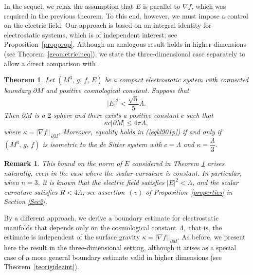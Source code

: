 \documentclass{amsart}
\newtheorem{theoremletter}{Theorem}
\newtheorem{remark}{Remark}
\numberwithin{equation}{section}
\begin{document}
In the sequel, we relax the assumption that 
\( E \) is parallel to \( \nabla f \), which was required in the previous theorem. To this end, however, we must impose a control  on the electric field. Our approach is based on an integral identity for electrostatic systems, which is of independent interest; see Proposition~\ref{propprop}. Although an analogous result holds in higher dimensions (see Theorem~\ref{geometricineq}), we state the three-dimensional case separately to allow a direct comparison with \cite[Theorem~D]{tiarlos}.






	\begin{theoremletter}\label{livreE}
	Let \( (M^{3},\,g,\,f,\,E) \) be a compact electrostatic system with connected boundary \( \partial M \) and positive cosmological constant. Suppose that
	\[
	\vert E\vert^{2} <  \frac{\sqrt{5}}{5} \Lambda .
	\]
Then $\partial M$ is a $2$-sphere and there exists a positive constant $c$ such that
	\begin{equation}
		\label{eqkl901p}
		\kappa c\vert\partial M\vert \leq 4\pi\Lambda,
	\end{equation} where \( \kappa = |\nabla f| \big|_{\partial M} \). Moreover, equality holds in (\ref{eqkl901p}) if and only if \( (M^{3},\,g,\,f) \) is isometric to the de Sitter system with $c=\Lambda$ and $\kappa = \dfrac{\Lambda}{3}$.
\end{theoremletter}




\begin{remark}\label{rem_E}
This bound on the norm of \( E \) considered in Theorem \ref{livreE} arises naturally, even in the case where the scalar curvature is constant. In particular, when \( n = 3 \), it is known that the electric field satisfies \( |E|^{2} < \Lambda \), and the scalar curvature satisfies \( R < 4\Lambda \); see assertion~\((v)\) of Proposition~\ref{properties} in Section \ref{Sec2}.
\end{remark}



By a different approach, we derive a boundary estimate for electrostatic manifolds that depends only on the cosmological constant $\Lambda,$ that is, the estimate is independent of the surface gravity \( \kappa = |\nabla f| \big|_{\partial M} \). As before, we present here the result in the three-dimensional setting, although it arises as a special case of a more general boundary estimate valid in higher dimensions (see Theorem~\ref{teorigidezint}).
\end{document}

